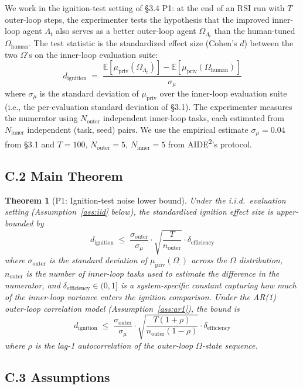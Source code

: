 \documentclass{article}
\newtheorem{theorem}{Theorem}
\theoremstyle{definition}
\begin{document}
We work in the ignition-test setting of \S3.4 P1: at the end of an RSI run with $T$ outer-loop steps, the experimenter tests the hypothesis that the improved inner-loop agent $\Lambda_t$ also serves as a better outer-loop agent $\Omega_{\Lambda_t}$ than the human-tuned $\Omega_{\text{human}}$. The test statistic is the standardized effect size (Cohen's $d$) between the two $\Omega$'s on the inner-loop evaluation suite:
\[
d_{\text{ignition}} \;=\; \frac{\mathbb{E}[\mu_{\text{priv}}(\Omega_{\Lambda_t})] - \mathbb{E}[\mu_{\text{priv}}(\Omega_{\text{human}})]}{\sigma_\mu}
\]
where $\sigma_\mu$ is the standard deviation of $\mu_{\text{priv}}$ over the inner-loop evaluation suite (i.e., the per-evaluation standard deviation of \S3.1). The experimenter measures the numerator using $N_{\text{outer}}$ independent inner-loop tasks, each estimated from $N_{\text{inner}}$ independent (task, seed) pairs. We use the empirical estimate $\sigma_\mu = 0.04$ from \S3.1 and $T = 100$, $N_{\text{outer}} = 5$, $N_{\text{inner}} = 5$ from AIDE\textsuperscript{2}'s protocol.

\subsection*{C.2 Main Theorem}

\begin{theorem}[P1: Ignition-test noise lower bound]
Under the i.i.d.\ evaluation setting (Assumption~\ref{ass:iid} below), the standardized ignition effect size is upper-bounded by
\[
d_{\text{ignition}} \;\le\; \frac{\sigma_{\text{outer}}}{\sigma_\mu} \cdot \sqrt{\frac{T}{n_{\text{outer}}}} \cdot \delta_{\text{efficiency}}
\]
where $\sigma_{\text{outer}}$ is the standard deviation of $\mu_{\text{priv}}(\Omega_{\cdot})$ across the $\Omega$ distribution, $n_{\text{outer}}$ is the number of inner-loop tasks used to estimate the difference in the numerator, and $\delta_{\text{efficiency}} \in (0, 1]$ is a system-specific constant capturing how much of the inner-loop variance enters the ignition comparison. Under the AR(1) outer-loop correlation model (Assumption~\ref{ass:ar1}), the bound is
\[
d_{\text{ignition}} \;\le\; \frac{\sigma_{\text{outer}}}{\sigma_\mu} \cdot \sqrt{\frac{T (1+\rho)}{n_{\text{outer}} (1-\rho)}} \cdot \delta_{\text{efficiency}}
\]
where $\rho$ is the lag-1 autocorrelation of the outer-loop $\Omega$-state sequence.
\end{theorem}

\subsection*{C.3 Assumptions}
\end{document}
